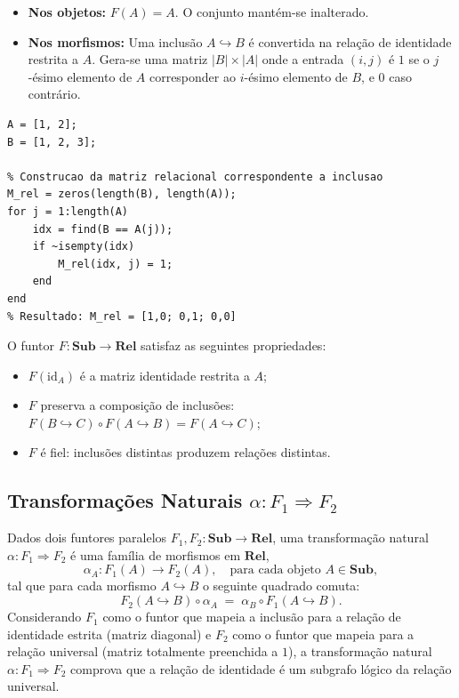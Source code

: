 \begin{itemize}
    \item \textbf{Nos objetos:} $F(A) = A$. O conjunto mantém-se inalterado.
    \item \textbf{Nos morfismos:} Uma inclusão $A \hookrightarrow B$ é convertida na relação de identidade restrita a $A$. Gera-se uma matriz $|B| \times |A|$ onde a entrada $(i,j)$ é $1$ se o $j$-ésimo elemento de $A$ corresponder ao $i$-ésimo elemento de $B$, e $0$ caso contrário.
\end{itemize}

\begin{lstlisting}[style=matlab, caption={Funtor $F$ aplicado a uma inclusão $A \hookrightarrow B$}]
A = [1, 2];
B = [1, 2, 3];

% Construcao da matriz relacional correspondente a inclusao
M_rel = zeros(length(B), length(A));
for j = 1:length(A)
    idx = find(B == A(j));
    if ~isempty(idx)
        M_rel(idx, j) = 1;
    end
end
% Resultado: M_rel = [1,0; 0,1; 0,0]
\end{lstlisting}

\begin{proposition}
O funtor $F: \mathbf{Sub} \to \mathbf{Rel}$ satisfaz as seguintes propriedades:
\begin{itemize}
    \item $F(\mathrm{id}_A)$ é a matriz identidade restrita a $A$;
    \item $F$ preserva a composição de inclusões: $F(B \hookrightarrow C) \circ F(A \hookrightarrow B) = F(A \hookrightarrow C)$;
    \item $F$ é fiel: inclusões distintas produzem relações distintas.
\end{itemize}
\end{proposition}

\subsection{Transformações Naturais \texorpdfstring{$\alpha: F_1 \Rightarrow F_2$}{alpha: F1 => F2}}

Dados dois funtores paralelos $F_1, F_2: \mathbf{Sub} \to \mathbf{Rel}$, uma transformação natural $\alpha: F_1 \Rightarrow F_2$ é uma família de morfismos em $\mathbf{Rel}$,
\[
    \alpha_A : F_1(A) \to F_2(A), \quad \text{para cada objeto } A \in \mathbf{Sub},
\]
tal que para cada morfismo $A \hookrightarrow B$ o seguinte quadrado comuta:
\[
    F_2(A \hookrightarrow B) \circ \alpha_A \;=\; \alpha_B \circ F_1(A \hookrightarrow B).
\]
Considerando $F_1$ como o funtor que mapeia a inclusão para a relação de identidade estrita (matriz diagonal) e $F_2$ como o funtor que mapeia para a relação universal (matriz totalmente preenchida a $1$), a transformação natural $\alpha: F_1 \Rightarrow F_2$ comprova que a relação de identidade é um subgrafo lógico da relação universal.

